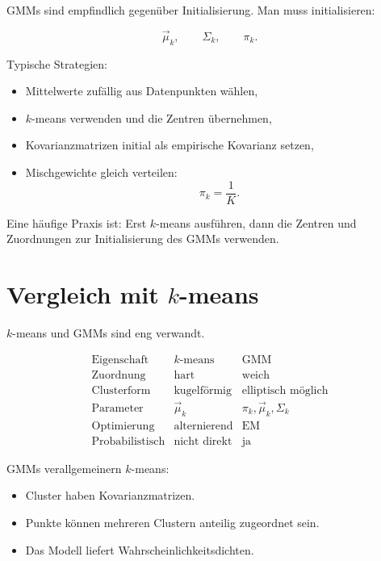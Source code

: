 GMMs sind empfindlich gegenüber Initialisierung.
Man muss initialisieren:

\[
    \vec{\mu}_k,
    \qquad
    \Sigma_k,
    \qquad
    \pi_k.
\]

Typische Strategien:

\begin{itemize}
    \item Mittelwerte zufällig aus Datenpunkten wählen,
    \item \(k\)-means verwenden und die Zentren übernehmen,
    \item Kovarianzmatrizen initial als empirische Kovarianz setzen,
    \item Mischgewichte gleich verteilen:
    \[
        \pi_k=\frac{1}{K}.
    \]
\end{itemize}

\begin{conceptbox}
Eine häufige Praxis ist:
Erst \(k\)-means ausführen, dann die Zentren und Zuordnungen zur Initialisierung des GMMs verwenden.
\end{conceptbox}

\section{Vergleich mit \(k\)-means}

\(k\)-means und GMMs sind eng verwandt.

\[
\begin{array}{c|c|c}
\text{Eigenschaft}
&
k\text{-means}
&
\text{GMM}
\\
\hline
\text{Zuordnung}
&
\text{hart}
&
\text{weich}
\\
\hline
\text{Clusterform}
&
\text{kugelförmig}
&
\text{elliptisch möglich}
\\
\hline
\text{Parameter}
&
\vec{\mu}_k
&
\pi_k,\vec{\mu}_k,\Sigma_k
\\
\hline
\text{Optimierung}
&
\text{alternierend}
&
\text{EM}
\\
\hline
\text{Probabilistisch}
&
\text{nicht direkt}
&
\text{ja}
\end{array}
\]

\begin{conceptbox}
GMMs verallgemeinern \(k\)-means:

\begin{itemize}
    \item Cluster haben Kovarianzmatrizen.
    \item Punkte können mehreren Clustern anteilig zugeordnet sein.
    \item Das Modell liefert Wahrscheinlichkeitsdichten.
\end{itemize}
\end{conceptbox}

